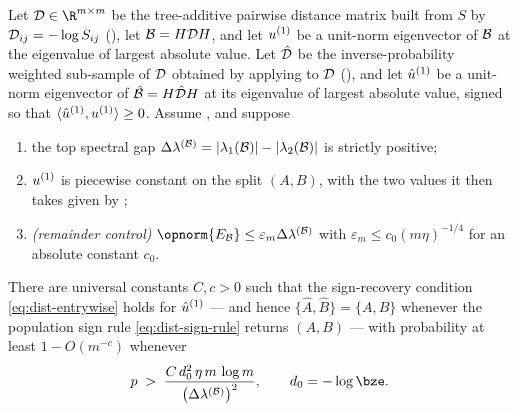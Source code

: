 \begin{theorem}\label{thm:main-dist}
Let $\Dmat\in\R^{m\times m}$ be the tree-additive pairwise distance matrix
built from $S$ by $\mathcal{D}_{ij}=-\log S_{ij}$ (), let
$\mathcal{B}=H\mathcal{D} H$, and let $u^{(1)}$ be a unit-norm eigenvector of $\mathcal{B}$ at the
eigenvalue of largest absolute value. Let $\hat{\mathcal{D}}$ be the inverse-probability
weighted sub-sample of $\mathcal{D}$ obtained by applying  to
$\mathcal{D}$ (), and let $\hat u^{(1)}$ be a unit-norm eigenvector of
$\hat{\mathcal{B}}=H\hat{\mathcal{D}} H$ at its eigenvalue of largest absolute value, signed so
that $\langle\hat u^{(1)},u^{(1)}\rangle\ge0$. Assume
, and suppose
\begin{enumerate}[label=(\roman*), leftmargin=2em, itemsep=1pt, topsep=2pt]
  \item the top spectral gap $\Delta\lambda^{(\mathcal{B})}=|\lambda_1(\mathcal{B})|-|\lambda_2(\mathcal{B})|$ is
        strictly positive;
  \item $u^{(1)}$ is piecewise constant on the split $(A,B)$, with the two values
        it then takes given by ;
  \item \emph{(remainder control)} $\opnorm{E_{\Bop}}\le\varepsilon_m\DlamB$ with
        $\varepsilon_m\le c_0(m\eta)^{-1/4}$ for an absolute constant $c_0$.
\end{enumerate}
There are universal constants $C,c>0$ such that the sign-recovery condition
\eqref{eq:dist-entrywise} holds for $\hat u^{(1)}$ --- and hence
$\{\widehat A,\widehat B\}=\{A,B\}$ whenever the population sign rule
\eqref{eq:dist-sign-rule} returns $(A,B)$ --- with probability at least
$1-O(m^{-c})$ whenever
\begin{equation}\label{eq:main-rate-dist}
   p \;>\; \frac{C\,d_0^{2}\,\eta\,m\,\log m}{\bigl(\DlamB\bigr)^{2}},
   \qquad d_0=-\log\bze .
\end{equation}
\end{theorem}

